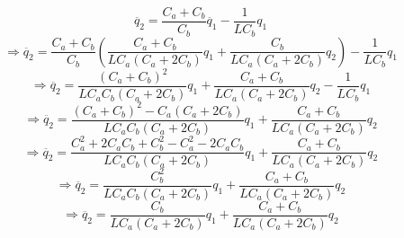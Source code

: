 \documentclass[fleqn]{article}
\begin{document}
\begin{enumerate}[nolistsep]
\begin{enumerate}[nolistsep]
					\begin{equation*}
						\ddot{q_2} = \frac{C_a + C_b}{C_b}\ddot{q_1} - \frac{1}{LC_b}q_1
					\end{equation*}
					\begin{equation*}
						\Rightarrow \ddot{q_2} = \frac{C_a + C_b}{C_b}\left(\frac{C_a + C_b}{LC_a(C_a + 2C_b)}q_1 + \frac{C_b}{LC_a(C_a + 2C_b)}q_2\right) - \frac{1}{LC_b}q_1
					\end{equation*}
					\begin{equation*}
						\Rightarrow \ddot{q_2} = \frac{(C_a + C_b)^2}{LC_aC_b(C_a + 2C_b)}q_1 + \frac{C_a + C_b}{LC_a(C_a + 2C_b)}q_2 - \frac{1}{LC_b}q_1
					\end{equation*}
					\begin{equation*}
						\Rightarrow \ddot{q_2} = \frac{(C_a + C_b)^2 - C_a(C_a + 2C_b)}{LC_aC_b(C_a + 2C_b)}q_1 + \frac{C_a + C_b}{LC_a(C_a + 2C_b)}q_2
					\end{equation*}
					\begin{equation*}
						\Rightarrow \ddot{q_2} = \frac{C_a^2 + 2C_aC_b + C_b^2 - C_a^2 - 2C_aC_b}{LC_aC_b(C_a + 2C_b)}q_1 + \frac{C_a + C_b}{LC_a(C_a + 2C_b)}q_2
					\end{equation*}
					\begin{equation*}
						\Rightarrow \ddot{q_2} = \frac{C_b^2}{LC_aC_b(C_a + 2C_b)}q_1 + \frac{C_a + C_b}{LC_a(C_a + 2C_b)}q_2
					\end{equation*}
					\begin{equation*}
						\Rightarrow \ddot{q_2} = \frac{C_b}{LC_a(C_a + 2C_b)}q_1 + \frac{C_a + C_b}{LC_a(C_a + 2C_b)}q_2
					\end{equation*}
			\end{enumerate}
	\end{enumerate}
\end{document}
